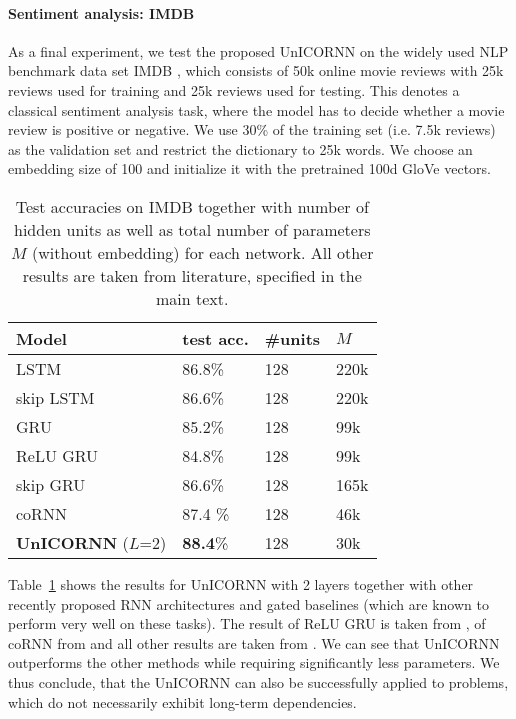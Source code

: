 \documentclass{article}
\newcommand{\Tref}[1]{Table~\ref{#1}}
\begin{document}
\paragraph{Sentiment analysis: IMDB}
As a final experiment, we test the proposed UnICORNN on the widely used NLP benchmark data set IMDB \citep{imdb}, which consists of 50k online movie reviews with 25k reviews used for training and 25k reviews used for testing. This denotes a classical sentiment analysis task, where the model has to decide whether a movie review is positive or negative. We use 30\% of the training set (i.e. 7.5k reviews) as the validation set and restrict the dictionary to 25k words. We choose an embedding size of 100 and initialize it with the pretrained 100d GloVe \cite{glove} vectors.
\begin{table}[t]
\caption{Test accuracies on IMDB together with number of hidden units as well as total number of parameters $M$ (without embedding) for each network. All other results are taken from literature, specified in the main text.}
\label{tab:imdb}
\vskip 0.15in
\begin{center}
\begin{small}
\begin{sc}
\begin{tabular}{llll}
\toprule
Model &  test acc. & \#units & $M$ \\
\midrule
LSTM&  86.8\% & 128 & 220k\\
skip LSTM & 86.6\% & 128 & 220k \\
GRU & 85.2\% & 128 & 99k\\
ReLU GRU & 84.8\% & 128 & 99k \\
skip GRU & 86.6\% & 128 & 165k\\
coRNN & 87.4 \% &128 & 46k \\
\textbf{UnICORNN} ($L$=2) & \textbf{88.4}\% & 128 & 30k\\
\bottomrule
\end{tabular}
\end{sc}
\end{small}
\end{center}
\vskip -0.1in
\end{table}
\Tref{tab:imdb} shows the results for UnICORNN with 2 layers together with other recently proposed RNN architectures and gated baselines (which are known to perform very well on these tasks). The result of ReLU GRU is taken from \cite{imdb_gru}, of coRNN from \cite{coRNN} and all other results are taken from \cite{imdb_base}. We can see that UnICORNN outperforms the other methods while requiring significantly less parameters. We thus conclude, that the UnICORNN can also be successfully applied to problems, which do not necessarily exhibit long-term dependencies.
\end{document}
